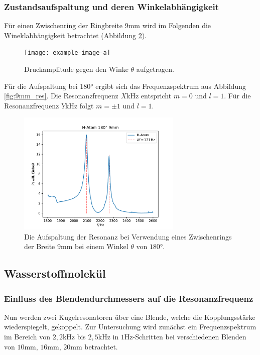 \subsubsection*{Zustandsaufspaltung und deren Winkelabhängigkeit}
Für einen Zwischenring der Ringbreite $9$mm wird im Folgenden die Wineklabhängigkeit betrachtet (Abbildung \ref{fig:9mm_winkel}).

\begin{figure}[H]
    \center
    \texttt{[image: example-image-a]}
    \caption{Druckamplitude gegen den Winke $\theta$ aufgetragen.}
    \label{fig:9mm_winkel}
\end{figure}

Für die Aufspaltung bei $180°$ ergibt sich das Frequenzspektrum aus Abbildung \ref{fig:9mm_res}.
Die Resonanzfrequenz $X$kHz entspricht $m=0$ und $l=1$. Für die Resonanzfrequenz $Y$kHz folgt $m=\pm 1$ und $l=1$.
\begin{figure}[H]
    \center
    \includegraphics[width=0.7\textwidth]{plots/Hatom/zustandsaufspaltung_9.pdf}
    \caption{Die Aufspaltung der Resonanz bei Verwendung eines Zwischenrings der Breite $9$mm bei einem Winkel $\theta$ von $180°$.}
    \label{fig:9mm_winkel}
\end{figure}
\newpage
\subsection{Wasserstoffmolekül}
\subsubsection*{Einfluss des Blendendurchmessers auf die Resonanzfrequenz}
Nun werden zwei Kugelresonatoren über eine Blende, welche die Kopplungsstärke wiederspiegelt, gekoppelt.
Zur Untersuchung wird zunächst ein Frequenzspektrum im Bereich von $2,2$kHz bis $2,5$kHz in $1$Hz-Schritten bei verschiedenen
Blenden von $10$mm, $16$mm, $20$mm betrachtet.\\

